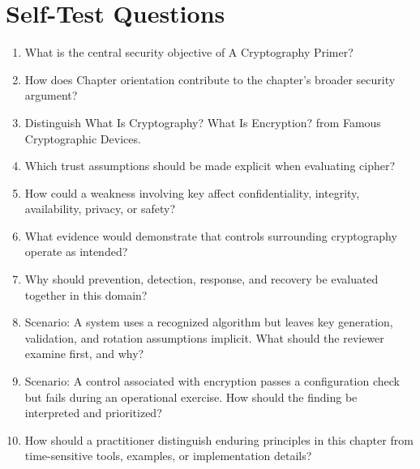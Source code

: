 \documentclass[11pt]{article}
\begin{document}
\section*{Self-Test Questions}
\begin{enumerate}
\item What is the central security objective of A Cryptography Primer?
\item How does Chapter orientation contribute to the chapter's broader security argument?
\item Distinguish What Is Cryptography? What Is Encryption? from Famous Cryptographic Devices.
\item Which trust assumptions should be made explicit when evaluating cipher?
\item How could a weakness involving key affect confidentiality, integrity, availability, privacy, or safety?
\item What evidence would demonstrate that controls surrounding cryptography operate as intended?
\item Why should prevention, detection, response, and recovery be evaluated together in this domain?
\item Scenario: A system uses a recognized algorithm but leaves key generation, validation, and rotation assumptions implicit. What should the reviewer examine first, and why?
\item Scenario: A control associated with encryption passes a configuration check but fails during an operational exercise. How should the finding be interpreted and prioritized?
\item How should a practitioner distinguish enduring principles in this chapter from time-sensitive tools, examples, or implementation details?
\end{enumerate}
\end{document}
